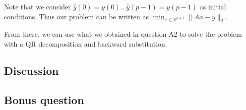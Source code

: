 \documentclass[11pt]{article}
\begin{document}
Note that we consider $\hat{y}(0) = y(0)\dots \hat{y}(p-1) = y(p-1)$ as initial conditions.
Thus our problem can be written as $\min_{x\in\mathbb{R}^{p+1}} \|Ax-y\|_2$.

From there, we can use what we obtained in question A2 to solve the problem with a QR decomposition and backward substitution.
\subsection*{Discussion}
\subsection*{Bonus question}
\end{document}
